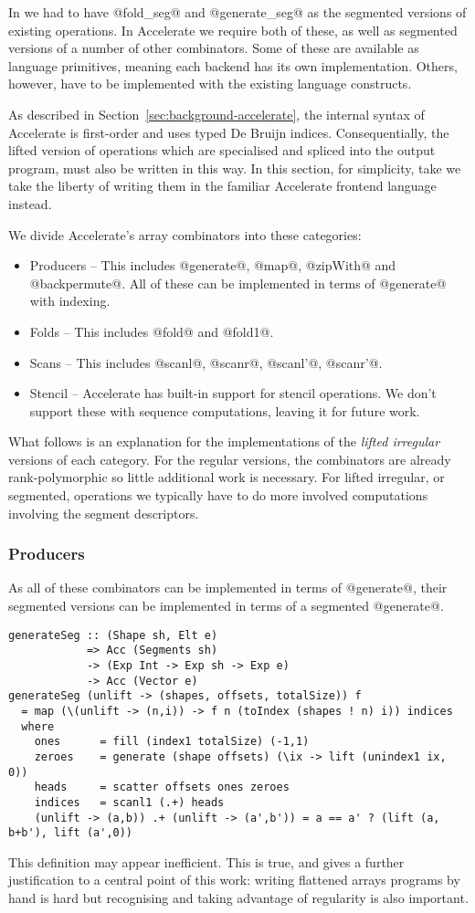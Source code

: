 In \ndp{} we had to have @fold_seg@ and @generate_seg@ as the segmented versions of existing operations. In Accelerate we require both of these, as well as segmented versions of a number of other combinators. Some of these are available as language primitives, meaning each backend has its own implementation. Others, however, have to be implemented with the existing language constructs.

As described in Section~\ref{sec:background-accelerate}, the internal syntax of Accelerate is first-order and uses typed De Bruijn indices. Consequentially, the lifted version of operations which are specialised and spliced into the output program, must also be written in this way. In this section, for simplicity, take we take the liberty of writing them in the familiar Accelerate frontend language instead.

We divide Accelerate's array combinators into these categories:
%
\begin{itemize}
\item Producers -- This includes @generate@, @map@, @zipWith@ and @backpermute@. All of these can be implemented in terms of @generate@ with indexing.
\item Folds -- This includes @fold@ and @fold1@.
\item Scans -- This includes @scanl@, @scanr@, @scanl'@, @scanr'@.
\item Stencil -- Accelerate has built-in support for stencil operations. We don't support these with sequence computations, leaving it for future work.
\end{itemize}

What follows is an explanation for the implementations of the \emph{lifted irregular} versions of each category. For the regular versions, the combinators are already rank-polymorphic so little additional work is necessary. For lifted irregular, or segmented, operations we typically have to do more involved computations involving the segment descriptors.

\subsubsection{Producers}
As all of these combinators can be implemented in terms of @generate@, their segmented versions can be implemented in terms of a segmented @generate@.
%
\begin{lstlisting}
generateSeg :: (Shape sh, Elt e)
            => Acc (Segments sh)
            -> (Exp Int -> Exp sh -> Exp e)
            -> Acc (Vector e)
generateSeg (unlift -> (shapes, offsets, totalSize)) f
  = map (\(unlift -> (n,i)) -> f n (toIndex (shapes ! n) i)) indices
  where
    ones      = fill (index1 totalSize) (-1,1)
    zeroes    = generate (shape offsets) (\ix -> lift (unindex1 ix, 0))
    heads     = scatter offsets ones zeroes
    indices   = scanl1 (.+) heads
    (unlift -> (a,b)) .+ (unlift -> (a',b')) = a == a' ? (lift (a, b+b'), lift (a',0))
\end{lstlisting}
%
This definition may appear inefficient. This is true, and gives a further justification to a central point of this work: writing flattened arrays programs by hand is hard but recognising and taking advantage of regularity is also important.

